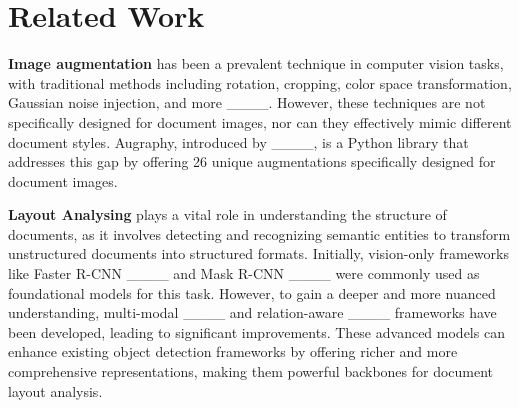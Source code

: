 \section{Related Work}
\textbf{Image augmentation} has been a prevalent technique in computer vision tasks, with traditional methods including rotation, cropping, color space transformation, Gaussian noise injection, and more ____. However, these techniques are not specifically designed for document images, nor can they effectively mimic different document styles. Augraphy, introduced by ____, is a Python library that addresses this gap by offering 26 unique augmentations specifically designed for document images.

\textbf{Layout Analysing} plays a vital role in understanding the structure of documents, as it involves detecting and recognizing semantic entities to transform unstructured documents into structured formats. Initially, vision-only frameworks like Faster R-CNN ____ and Mask R-CNN ____ were commonly used as foundational models for this task. However, to gain a deeper and more nuanced understanding, multi-modal ____ and relation-aware ____ frameworks have been developed, leading to significant improvements. These advanced models can enhance existing object detection frameworks by offering richer and more comprehensive representations, making them powerful backbones for document layout analysis.